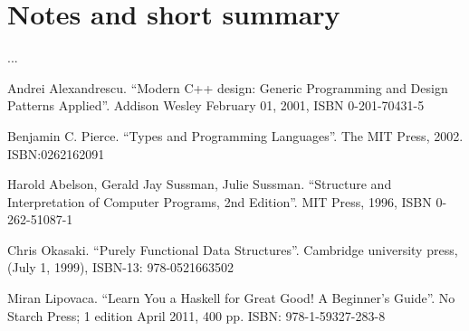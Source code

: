 \documentclass{article}
\begin{document}
\section{Notes and short summary}
...


\begin{thebibliography}{99}

Andrei Alexandrescu. ``Modern C++ design: Generic Programming and Design Patterns Applied''. Addison Wesley February 01, 2001, ISBN 0-201-70431-5

Benjamin C. Pierce. ``Types and Programming Languages''. The MIT Press, 2002. ISBN:0262162091

Harold Abelson, Gerald Jay Sussman, Julie Sussman. ``Structure and Interpretation of Computer Programs, 2nd Edition''. MIT Press, 1996, ISBN 0-262-51087-1

Chris Okasaki. ``Purely Functional Data Structures''. Cambridge university press, (July 1, 1999), ISBN-13: 978-0521663502

Miran Lipovaca. ``Learn You a Haskell for Great Good! A Beginner's Guide''. No Starch Press; 1 edition April 2011, 400 pp. ISBN: 978-1-59327-283-8

\end{thebibliography}

\ifx\wholebook\relax \else
\end{document}
